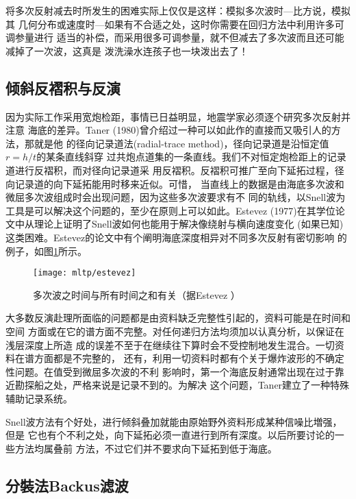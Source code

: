 将多次反射减去时所发生的困难实际上仅仅是这样：模拟多次波时---比方说，模拟其
几何分布或速度时---如果有不合适之处，这时你需要在回归方法中利用许多可调参量进行
适当的补偿，而采用很多可调参量，就不但减去了多次波而且还可能减掉了一次波，这真是
泼洗澡水连孩子也一块泼出去了！

\subsection{倾斜反褶积与反演}
\label{sec:5.6.5}

因为实际工作采用宽炮检距，事情已日益明显，地震学家必须逐个研究多次反射并注意
海底的差异。Taner (1980)曾介绍过一种可以如此作的直接而又吸引人的方法，那就是他
的径向记录道法(radial-trace method)，径向记录道是沿恒定值$r=h/t$的某条直线斜穿
过共炮点道集的一条直线。我们不对恒定炮检距上的记录道进行反褶积，而对径向记录道采
用反褶积。反褶积可推广至向下延拓过程，径向记录道的向下延拓能用时移来近似。可惜，
当直线上的数据是由海底多次波和微屈多次波组成时会出现问题，因为这些多次波要求有不
同的轨线，以Snell波为工具是可以解决这个问题的，至少在原则上可以如此。Estevez
(1977)在其学位论文中从理论上证明了Snell波如何也能用于解决像绕射与横向速度变化
(如果已知)这类困难。Estevez的论文中有个阐明海底深度相异对不同多次反射有密切影响
的例子，如图\ref{fig:mltp/estevez}所示。

\begin{figure}[H]
\centering
\texttt{[image: mltp/estevez]}
\caption[estevez]{
多次波之时间与所有时间之和有关（据Estevez ）
}
\label{fig:mltp/estevez}
\end{figure}

大多数反演赴理所面临的问题都是由资料缺乏完整性引起的，资料可能是在时间和空间
方面或在它的谱方面不完整。对任何递归方法均须加以认真分析，以保证在浅层深度上所造
成的误差不至于在继续往下算时会不受控制地发生混合。一切资料在谱方面都是不完整的，
还有，利用一切资料时都有个关于爆炸波形的不确定性问题。在值受到微屈多次波的不利
影响时，第一个海底反射通常出现在过于靠近勘探船之处，严格来说是记录不到的。为解决
这个问题，Taner建立了一种特殊辅助记录系统。

Snell波方法有个好处，进行倾斜叠加就能由原始野外资料形成某种信噪比増强，但是
它也有个不利之处，向下延拓必须一直进行到所有深度。以后所要讨论的一些方法均属叠前
方法，不过它们并不要求向下延拓到低于海底。

\subsection{分裝法Backus滤波}
\label{sec:5.6.6}

